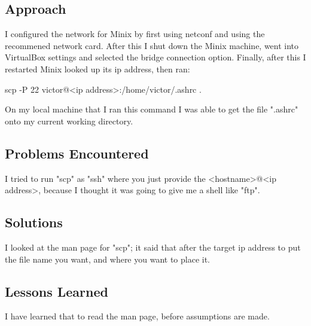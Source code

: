 \documentclass[11pt]{article}
\begin{document}
\subsection{Approach}

  I configured the network for Minix by first using netconf and using the recommened 
network card. After this I shut down the Minix machine, went into VirtualBox settings and selected 
the bridge connection option. Finally, 
after this I restarted Minix looked up its ip address, then ran:

{\tt\begin{tabbing}
scp -P 22 victor@<ip address>:/home/victor/.ashrc .
\end{tabbing}}

  On my local machine that I ran this command I was able to get the file ".ashrc" onto my
current working directory.


\subsection{Problems Encountered}

  I tried to run "scp" as "ssh" where you just provide the <hostname>@<ip address>,
because I thought it was going to give me a shell like "ftp".


\subsection{Solutions}

  I looked at the man page for "scp"; it said that after the target ip address to put the 
file name you want, and where you want to place it.

\subsection{Lessons Learned}
 I have learned that to read the man page, before assumptions are made.
  
  
\end{document}
